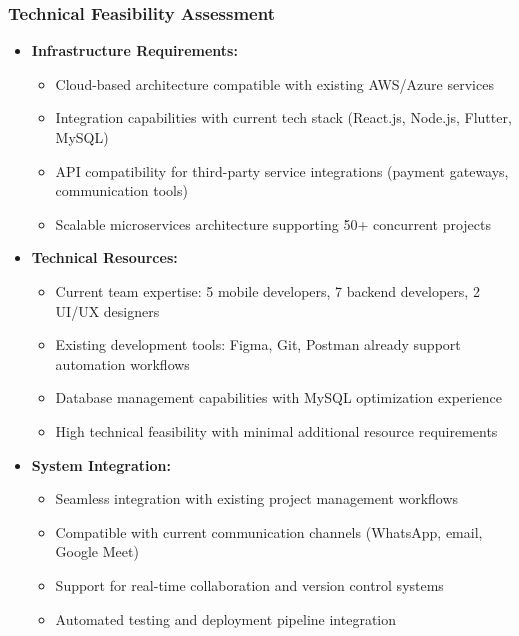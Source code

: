 \documentclass[12pt,a4paper]{article}
\begin{document}
\subsubsection{Technical Feasibility Assessment}
\begin{itemize}
    \item \textbf{Infrastructure Requirements:}
    \begin{itemize}
        \item Cloud-based architecture compatible with existing AWS/Azure services
        \item Integration capabilities with current tech stack (React.js, Node.js, Flutter, MySQL)
        \item API compatibility for third-party service integrations (payment gateways, communication tools)
        \item Scalable microservices architecture supporting 50+ concurrent projects
    \end{itemize}
    
    \item \textbf{Technical Resources:}
    \begin{itemize}
        \item Current team expertise: 5 mobile developers, 7 backend developers, 2 UI/UX designers
        \item Existing development tools: Figma, Git, Postman already support automation workflows
        \item Database management capabilities with MySQL optimization experience
        \item High technical feasibility with minimal additional resource requirements
    \end{itemize}
    
    \item \textbf{System Integration:}
    \begin{itemize}
        \item Seamless integration with existing project management workflows
        \item Compatible with current communication channels (WhatsApp, email, Google Meet)
        \item Support for real-time collaboration and version control systems
        \item Automated testing and deployment pipeline integration
    \end{itemize}
\end{itemize}
\end{document}
